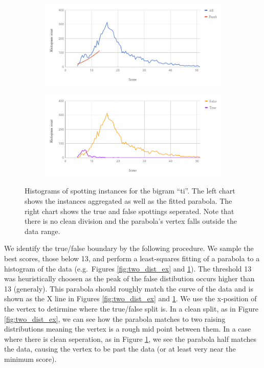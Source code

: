 \documentclass[ms,electronic,twosidetoc,letterpaper,chaptercenter,parttop,lof,lot]{byumsphd}
\begin{document}
\begin{figure}
    \centering
    \begin{subfigure}{.89\textwidth}
  		\centering
  		\includegraphics[width=.99\linewidth]{one_dist_ex_All}
	\end{subfigure}
	\begin{subfigure}{.89\textwidth}
  		\centering
  		\includegraphics[width=.99\linewidth]{one_dist_ex_TF}
	\end{subfigure}
    \caption{Histograms of spotting instances for the bigram ``ti''. The left chart shows the instances aggregated as well as the fitted parabola. The right chart shows the true and false spottings seperated. Note that there is no clean division and the parabola's vertex falls outside the data range.
    }
    \label{fig:one_dist_ex}
\end{figure}

We identify the true/false boundary by the following procedure. We sample the best scores, those below 13, and perform a least-squares fitting of a parabola to a histogram of the data (e.g.~Figures \ref{fig:two_dist_ex} and \ref{fig:one_dist_ex}). The threshold 13 was heuristically choosen as the peak of the false distibution occurs higher than 13 (generaly). This parabola should roughly match the curve of the data and is shown as the X line in Figures \ref{fig:two_dist_ex} and \ref{fig:one_dist_ex}. We use the x-position of the vertex to detirmine where the true/false split is. In a clean split, as in Figure \ref{fig:two_dist_ex}, we can see how the parabola matches to two raising distributions meaning the vertex is a rough mid point between them. In a case where there is clean seperation, as in Figure \ref{fig:one_dist_ex}, we see the parabola half matches the data, causing the vertex to be past the data (or at least very near the minimum score).
\end{document}
